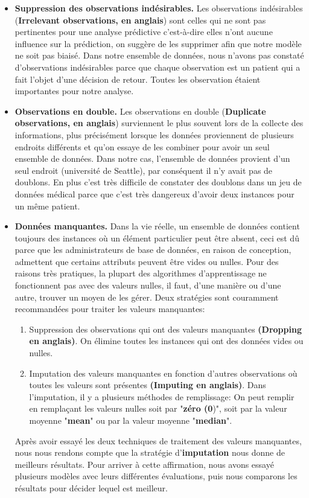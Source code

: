 \documentclass[12pt, french]{report}
\begin{document}
\begin{itemize}
	\item \textbf{Suppression des observations indésirables.} Les observations indésirables (\textbf{Irrelevant observations, en anglais}) sont celles qui ne sont pas pertinentes pour une analyse prédictive c'est-à-dire elles n'ont aucune influence sur la prédiction, on suggère de les supprimer afin que notre modèle ne soit pas biaisé. Dans notre ensemble de données, nous n'avons pas constaté d'observations indésirables parce que chaque observation est un patient qui a fait l'objet d'une décision de retour. Toutes les observation étaient importantes pour notre analyse.
	\item \textbf{Observations en double.} Les observations en double (\textbf{Duplicate observations, en anglais}) surviennent le plus souvent lors de la collecte des informations, plus précisément lorsque les données proviennent de plusieurs endroits différents et qu'on essaye de les combiner pour avoir un seul ensemble de données. Dans notre cas, l'ensemble de données provient d'un seul endroit (université de Seattle), par conséquent il n'y avait pas de doublons. En plus c'est très difficile de constater des doublons dans un jeu de données médical parce que c'est très dangereux d'avoir deux instances pour un même patient.
	\item \textbf{Données manquantes.} Dans la vie réelle, un ensemble de données contient toujours des instances où un élément particulier peut être absent, ceci est dû parce que les administrateurs de base de données, en raison de conception, admettent que certains attributs peuvent être vides ou nulles. Pour des raisons très pratiques, la plupart des algorithmes d'apprentissage ne fonctionnent pas avec des valeurs nulles, il faut, d'une manière ou d'une autre, trouver un moyen de les gérer. Deux stratégies sont couramment recommandées pour traiter les valeurs manquantes:
	\begin{enumerate}
		\item Suppression des observations qui ont des valeurs manquantes \textbf{(Dropping en anglais)}. On élimine toutes les instances qui ont des données vides ou nulles.
		\item Imputation des valeurs manquantes en fonction d'autres observations où toutes les valeurs sont présentes \textbf{(Imputing en anglais)}. Dans l'imputation, il y a plusieurs méthodes de remplissage: On peut remplir en remplaçant les valeurs nulles soit par "\textbf{zéro (0})", soit par la valeur moyenne "\textbf{mean}" ou par la valeur moyenne "\textbf{median}". 
	\end{enumerate}
	Après avoir essayé les deux techniques de traitement des valeurs manquantes, nous nous rendons compte que la stratégie d'\textbf{imputation} nous donne de meilleurs résultats. Pour arriver à cette affirmation, nous avons essayé plusieurs modèles avec leurs différentes évaluations, puis nous comparons les résultats pour décider lequel est meilleur.\\ 
\end{itemize}
\end{document}
